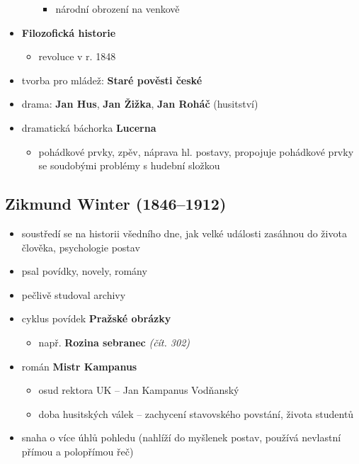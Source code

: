 \begin{itemize}
\begin{itemize}
		\begin{itemize}
		\item národní obrození na venkově
		\end{itemize}
	\end{itemize}
\item \textbf{Filozofická historie}
	\begin{itemize}
	\item revoluce v r. 1848
	\end{itemize}
\item tvorba pro mládež: \textbf{Staré pověsti české}
\item drama: \textbf{Jan Hus}, \textbf{Jan Žižka}, \textbf{Jan Roháč} (husitství)
\item dramatická báchorka \textbf{Lucerna}
	\begin{itemize}
	\item pohádkové prvky, zpěv, náprava hl. postavy, propojuje pohádkové prvky se soudobými problémy s hudební složkou
	\end{itemize}
\end{itemize}

\subsection{Zikmund Winter (1846--1912)}
\begin{itemize}
\item soustředí se na historii všedního dne, jak velké události zasáhnou do života člověka, psychologie postav
\item psal povídky, novely, romány
\item pečlivě studoval archivy
\item cyklus povídek \textbf{Pražské obrázky}
	\begin{itemize}
	\item např. \textbf{Rozina sebranec} \textit{(čít. 302)}
	\end{itemize}
\item román \textbf{Mistr Kampanus}
	\begin{itemize}
	\item osud rektora UK -- Jan Kampanus Vodňanský
	\item doba husitských válek -- zachycení stavovského povstání, života studentů
	\end{itemize}
\item snaha o více úhlů pohledu (nahlíží do myšlenek postav, používá nevlastní přímou a polopřímou řeč)
\end{itemize}

